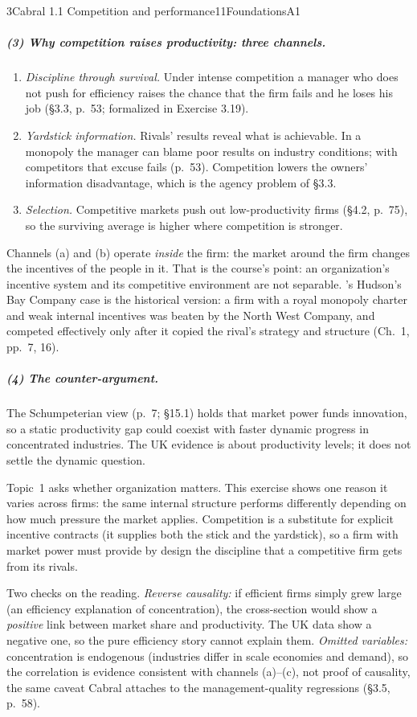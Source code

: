 \begin{exsol}{3}{Cabral 1.1 Competition and performance}{11}{Foundations}{A1}
\subparagraph{(3) Why competition raises productivity: three channels.}
\begin{enumerate}[label=(\alph*)]
  \item \emph{Discipline through survival.} Under intense competition a manager who does not push
  for efficiency raises the chance that the firm fails and he loses his job (\S3.3, p.~53;
  formalized in Exercise 3.19).
  \item \emph{Yardstick information.} Rivals' results reveal what is achievable. In a monopoly
  the manager can blame poor results on industry conditions; with competitors that excuse fails
  (p.~53). Competition lowers the owners' information disadvantage, which is the agency problem
  of \S3.3.
  \item \emph{Selection.} Competitive markets push out low-productivity firms (\S4.2, p.~75), so
  the surviving average is higher where competition is stronger.
\end{enumerate}
Channels (a) and (b) operate \emph{inside} the firm: the market around the firm changes the
incentives of the people in it. That is the course's point: an organization's incentive system
and its competitive environment are not separable. \MR's Hudson's Bay Company case is the
historical version: a firm with a royal monopoly charter and weak internal incentives was beaten
by the North West Company, and competed effectively only after it copied the rival's strategy
and structure (Ch.~1, pp.~7, 16).

\subparagraph{(4) The counter-argument.} The Schumpeterian view (p.~7; \S15.1) holds that market
power funds innovation, so a static productivity gap could coexist with faster dynamic
progress in concentrated industries. The UK evidence is about productivity levels; it does not
settle the dynamic question.

\interp Topic~1 asks whether organization matters. This exercise shows one reason it varies
across firms: the same internal structure performs differently depending on how much pressure
the market applies. Competition is a substitute for explicit incentive contracts (it supplies
both the stick and the yardstick), so a firm with market power must provide by design the
discipline that a competitive firm gets from its rivals.

\verify Two checks on the reading. \emph{Reverse causality:} if efficient firms simply grew
large (an efficiency explanation of concentration), the cross-section would show a
\emph{positive} link between market share and productivity. The UK data show a negative one, so
the pure efficiency story cannot explain them. \emph{Omitted variables:} concentration is
endogenous (industries differ in scale economies and demand), so the correlation is evidence
consistent with channels (a)--(c), not proof of causality, the same caveat Cabral attaches to the
management-quality regressions (\S3.5, p.~58).


\end{exsol}
